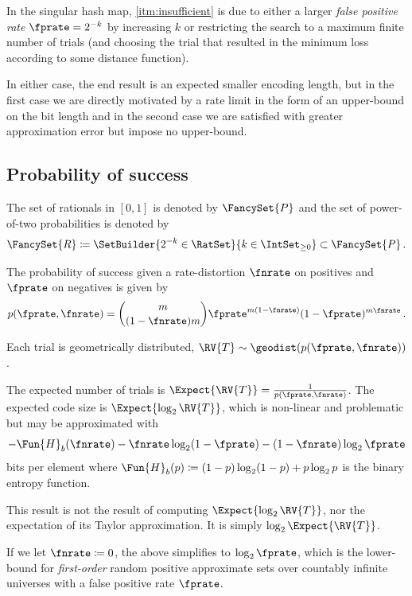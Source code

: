 \documentclass[ ../main.tex]{subfiles}
\begin{document}
In the singular hash map, \cref{itm:insufficient} is due to either a larger \emph{false positive rate} $\fprate = 2^{-k}$ by increasing $k$ or restricting the search to a maximum finite number of trials (and choosing the trial that resulted in the minimum loss according to some distance function).

In either case, the end result is an expected smaller encoding length, but in the first case we are directly motivated by a rate limit in the form of an upper-bound on the bit length and in the second case we are satisfied with greater approximation error but impose no upper-bound.

\subsection{Probability of success}

The set of rationals in $[0,1]$ is denoted by $\FancySet{P}$ and the set of power-of-two probabilities is denoted by
\begin{equation}
	\FancySet{R} \coloneqq \SetBuilder{2^{-k} \in \RatSet}{k \in \IntSet_{\geq 0}} \subset \FancySet{P}\,.
\end{equation}

The probability of success given a rate-distortion $\fnrate$ on positives and $\fprate$ on negatives is given by
\begin{equation}
	p(\fprate,\fnrate) = \binom{m}{(1-\fnrate)m} \fprate^{m(1-\fnrate)} (1-\fprate)^{m \fnrate}\,.
\end{equation}

Each trial is geometrically distributed, $\RV{T} \sim \geodist(p(\fprate,\fnrate))$.

The expected number of trials is $\Expect{\RV{T}} = \frac{1}{p(\fprate,\fnrate)}$.
The expected code size is $\Expect{\log_2 \RV{T}}$, which is non-linear and problematic but may be approximated with
\begin{equation}
	-\Fun{H}_b(\fnrate) - \fnrate \log_2 (1-\fprate) - (1-\fnrate) \log_2 \fprate
\end{equation}
bits per element where $\Fun{H}_b(p) \coloneqq (1-p)\log_2(1-p) + p \log_2 p$ is the binary entropy function.

This result is not the result of computing $\Expect{\log_2 \RV{T}}$, nor the expectation of its Taylor approximation.
It is simply $\log_2 \Expect{\RV{T}}$.

If we let $\fnrate \coloneqq 0$, the above simplifies to $\log_2 \fprate$, which is the lower-bound for \emph{first-order} random positive approximate sets over countably infinite universes with a false positive rate $\fprate$.
\end{document}
